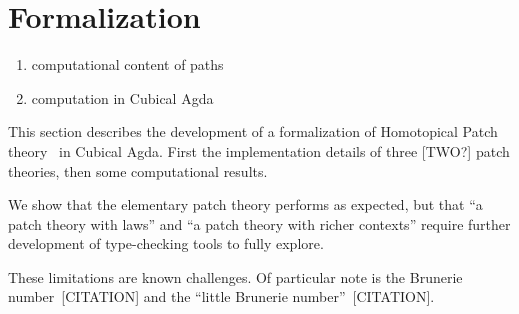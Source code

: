 \chapter{Formalization}\label{ch/formalization}

\begin{enumerate}
\item computational content of paths~\cite{Angiuli2016}
\item computation in Cubical Agda~\cite{vezzosi2021cubical, Angiuli2016}
\end{enumerate}

This section describes the development of a formalization of Homotopical Patch
theory~\cite{Angiuli2016} in Cubical Agda. First the implementation details of
three [TWO?] patch theories, then some computational results.

We show that the elementary patch theory performs as expected, but that ``a
patch theory with laws'' and ``a patch theory with richer contexts'' require
further development of type-checking tools to fully explore.

These limitations are known challenges. Of particular note is the Brunerie
number~[CITATION] and the ``little Brunerie number''~[CITATION].